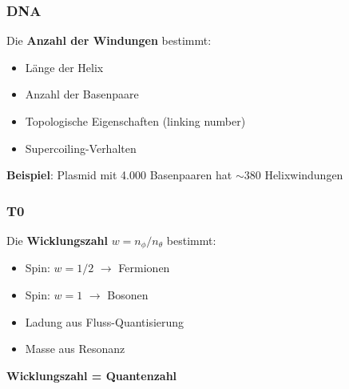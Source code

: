 	\subsubsection{DNA}

	Die \textbf{Anzahl der Windungen} bestimmt:
	\begin{itemize}
		\item Länge der Helix
		\item Anzahl der Basenpaare
		\item Topologische Eigenschaften (linking number)
		\item Supercoiling-Verhalten
	\end{itemize}

	\textbf{Beispiel}: Plasmid mit 4.000 Basenpaaren hat $\sim$380 Helixwindungen

	\subsubsection{T0}

	Die \textbf{Wicklungszahl} $w = n_\phi / n_\theta$ bestimmt:
	\begin{itemize}
		\item Spin: $w = 1/2$ $\to$ Fermionen
		\item Spin: $w = 1$ $\to$ Bosonen
		\item Ladung aus Fluss-Quantisierung
		\item Masse aus Resonanz
	\end{itemize}

	\begin{keyresult}
		\textbf{Wicklungszahl = Quantenzahl}

		\vspace{0.3cm}

		\begin{center}
		\end{center}
	\end{keyresult}

